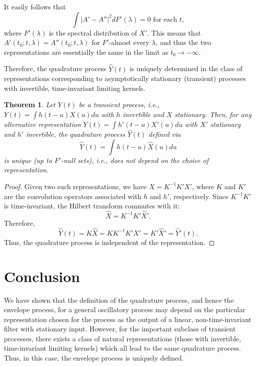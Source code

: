 \documentclass{article}
\newtheorem{theorem}{Theorem}
\begin{document}
It easily follows that
\begin{equation}
\label{eq:a_diff}
\int |A' - A''|^2 dF'(\lambda) = 0 \text{ for each } t,
\end{equation}
where $F'(\lambda)$ is the spectral distribution of $X'$. This means that $A'(t_0; t, \lambda) = A''(t_0; t, \lambda)$ for $F'$-almost every $\lambda$, and thus the two representations are essentially the same in the limit as $t_0 \to -\infty$.

Therefore, the quadrature process $\hat{Y}(t)$ is uniquely determined in the class of representations corresponding to asymptotically stationary (transient) processes with invertible, time-invariant limiting kernels.

\begin{theorem}\label{thm:uniqueness}
Let $Y(t)$ be a transient process, i.e., $Y(t) = \int h(t-u) X(u) du$ with $h$ invertible and $X$ stationary. Then, for any alternative representation $Y(t) = \int h'(t-u) X'(u) du$ with $X'$ stationary and $h'$ invertible, the quadrature process $\hat{Y}(t)$ defined via
\[
\hat{Y}(t) = \int h(t-u) \hat{X}(u) du
\]
is unique (up to $F'$-null sets), i.e., does not depend on the choice of representation.
\end{theorem}

\begin{proof}
Given two such representations, we have $X = K^{-1} K' X'$, where $K$ and $K'$ are the convolution operators associated with $h$ and $h'$, respectively. Since $K^{-1} K'$ is time-invariant, the Hilbert transform commutes with it:
\[
\hat{X} = K^{-1} K' \hat{X}'.
\]
Therefore,
\[
\hat{Y}(t) = K \hat{X} = K K^{-1} K' \hat{X}' = K' \hat{X}' = \hat{Y}'(t).
\]
Thus, the quadrature process is independent of the representation.
\end{proof}

\section{Conclusion}

We have shown that the definition of the quadrature process, and hence the envelope process, for a general oscillatory process may depend on the particular representation chosen for the process as the output of a linear, non-time-invariant filter with stationary input. However, for the important subclass of transient processes, there exists a class of natural representations (those with invertible, time-invariant limiting kernels) which all lead to the same quadrature process. Thus, in this case, the envelope process is uniquely defined.
\end{document}
